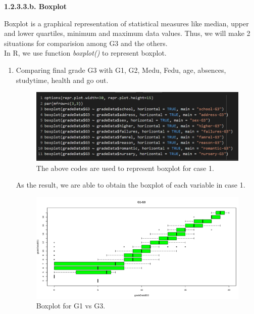 \documentclass[a4paper]{article}
\begin{document}
\textbf{1.2.3.3.b. Boxplot \\ \newline}
Boxplot is a graphical representation of statistical measures like median, upper and lower quartiles, minimum and maximum data values. Thus, we will make 2 situations for comparision among G3 and the others. \\ \newline
In R, we use function \textit{boxplot()} to represent boxplot. 
\begin{enumerate}
    \item Comparing final grade G3 with G1, G2, Medu, Fedu, age, absences, studytime, health and go out. 
    \begin{figure}[H]
        \centering
        \includegraphics[scale = 0.9]{Images/21.PNG}
        \caption{The above codes are used to represent boxplot for case 1.}
        \label{fig:boxplot1}
    \end{figure}
    As the result, we are able to obtain the boxplot of each variable in case 1.
    \begin{figure}[H]
        \centering
        \begin{minipage}{0.5\textwidth}
            \centering
            \includegraphics[width = 1\linewidth]{Images/22.PNG}
            \caption{Boxplot for G1 vs G3.}
            \label{fig:boxplot2}

\end{minipage}
\end{figure}
\end{enumerate}
\end{document}
